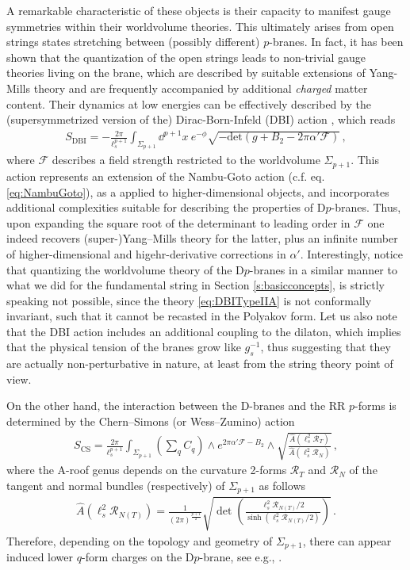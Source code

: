 A remarkable characteristic of these objects is their capacity to manifest gauge symmetries within their worldvolume theories. This ultimately arises from open strings states stretching between (possibly different) $p$-branes. In fact, it has been shown that the quantization of the open strings leads to non-trivial gauge theories living on the brane, which are described by suitable extensions of Yang-Mills theory and are frequently accompanied by additional \emph{charged} matter content. Their dynamics at low energies can be effectively described by the (supersymmetrized version of the) Dirac-Born-Infeld (DBI) action \cite{Born:1934gh, Dirac:1962iy}, which reads
%
\begin{align}\label{eq:DBITypeIIA}
S_\text{DBI} = -\frac{2\pi}{\ell_s^{p+1}} \int_{\Sigma_{p+1}} \dd^{p+1} x\ e^{-\phi} \sqrt{-\text{det} \left(g+B_2 -2\pi \alpha' \mathcal{F} \right)}\, ,
\end{align}
%
where $\mathcal{F}$ describes a field strength restricted to the worldvolume $\Sigma_{p+1}$. This action represents an extension of the Nambu-Goto action (c.f. eq. \eqref{eq:NambuGoto}), as a applied to higher-dimensional objects, and incorporates additional complexities suitable for describing the properties of D$p$-branes. Thus, upon expanding the square root of the determinant to leading order in $\mathcal{F}$ one indeed recovers (super-)Yang--Mills theory for the latter, plus an infinite number of higher-dimensional and higehr-derivative corrections in $\alpha'$. Interestingly, notice that quantizing the worldvolume theory of the D$p$-branes in a similar manner to what we did for the fundamental string in Section \ref{s:basicconcepts}, is strictly speaking not possible, since the theory \eqref{eq:DBITypeIIA} is not conformally invariant, such that it cannot be recasted in the Polyakov form. Let us also note that the DBI action includes an additional coupling to the dilaton, which implies that the physical tension of the branes grow like $g_s^{-1}$, thus suggesting that they are actually non-perturbative in nature, at least from the string theory point of view. 

On the other hand, the interaction between the D-branes and the RR $p$-forms is determined by the Chern--Simons (or Wess--Zumino) action 
%
\begin{align}\label{eq:CSWZactionTypeIIA}
S_\text{CS} = \frac{2\pi}{\ell_s^{p+1}} \int_{\Sigma_{p+1}} \left(\sum_q C_q \right) \wedge e^{2\pi \alpha' \mathcal{F} -B_2} \wedge \sqrt{\frac{\hat A (\ell_s^2 \mathcal{R}_T)}{\hat A (\ell_s^2 \mathcal{R}_N)}}\, ,
\end{align}
%
where the ${\text{A}}$-roof genus depends on the curvature 2-forms $\mathcal{R}_T$ and $\mathcal{R}_N$ of the tangent and normal bundles (respectively) of $\Sigma_{p+1}$ as follows 
%
\begin{align}
\hat A \left(\ell_s^2 \mathcal{R}_{N(T)} \right) = \frac{1}{(2\pi)^{\frac{p+1}{2}}} \sqrt{\det \left( \frac{\ell_s^2 \mathcal{R}_{N(T)}/2}{\sinh \left( \ell_s^2 \mathcal{R}_{N(T)}/2\right)}\right)}\, .
\end{align}
%
Therefore, depending on the topology and geometry of $\Sigma_{p+1}$, there can appear induced lower $q$-form charges on the D$p$-brane, see e.g., \cite{Witten:1998cd}. 

